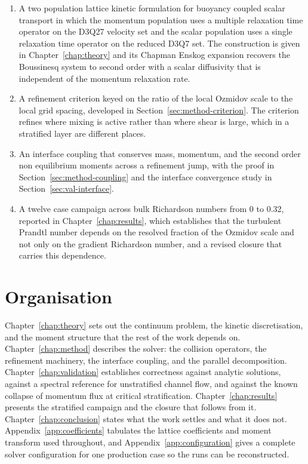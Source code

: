 \begin{enumerate}
  \item A two population lattice kinetic formulation for buoyancy coupled scalar
    transport in which the momentum population uses a multiple relaxation time
    operator on the D3Q27 velocity set and the scalar population uses a single
    relaxation time operator on the reduced D3Q7 set. The construction is given
    in Chapter~\ref{chap:theory} and its Chapman Enskog expansion recovers the
    Boussinesq system to second order with a scalar diffusivity that is
    independent of the momentum relaxation rate.
  \item A refinement criterion keyed on the ratio of the local Ozmidov scale to
    the local grid spacing, developed in Section~\ref{sec:method-criterion}. The
    criterion refines where mixing is active rather than where shear is large,
    which in a stratified layer are different places.
  \item An interface coupling that conserves mass, momentum, and the second
    order non equilibrium moments across a refinement jump, with the proof in
    Section~\ref{sec:method-coupling} and the interface convergence study in
    Section~\ref{sec:val-interface}.
  \item A twelve case campaign across bulk Richardson numbers from 0 to 0.32,
    reported in Chapter~\ref{chap:results}, which establishes that the turbulent
    Prandtl number depends on the resolved fraction of the Ozmidov scale and not
    only on the gradient Richardson number, and a revised closure that carries
    this dependence.
\end{enumerate}

\section{Organisation}
\label{sec:intro-organisation}

Chapter~\ref{chap:theory} sets out the continuum problem, the kinetic
discretisation, and the moment structure that the rest of the work depends on.
Chapter~\ref{chap:method} describes the solver: the collision operators, the
refinement machinery, the interface coupling, and the parallel decomposition.
Chapter~\ref{chap:validation} establishes correctness against analytic solutions,
against a spectral reference for unstratified channel flow, and against the known
collapse of momentum flux at critical stratification. Chapter~\ref{chap:results}
presents the stratified campaign and the closure that follows from it.
Chapter~\ref{chap:conclusion} states what the work settles and what it does not.
Appendix~\ref{app:coefficients} tabulates the lattice coefficients and moment
transform used throughout, and Appendix~\ref{app:configuration} gives a complete
solver configuration for one production case so the runs can be reconstructed.
